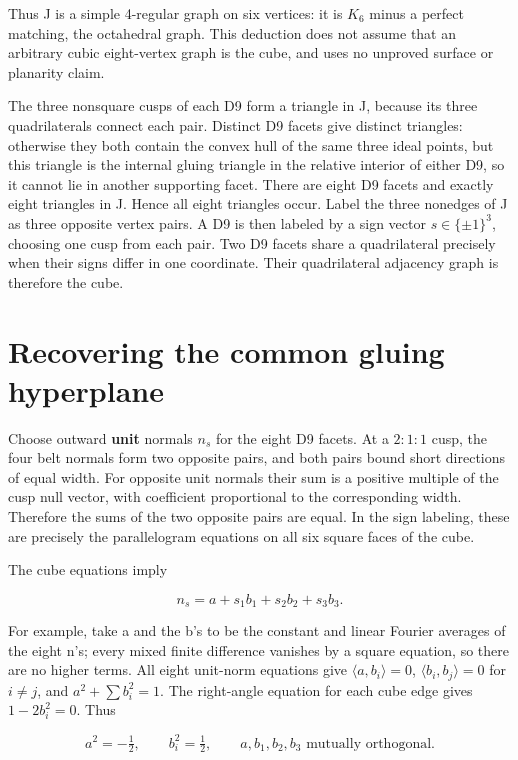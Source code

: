 \documentclass[11pt]{article}
\begin{document}
Thus J is a simple 4-regular graph on six vertices: it is \(K_6\) minus a perfect matching, the octahedral graph. This deduction does not assume that an arbitrary cubic eight-vertex graph is the cube, and uses no unproved surface or planarity claim.

The three nonsquare cusps of each D9 form a triangle in J, because its three quadrilaterals connect each pair. Distinct D9 facets give distinct triangles: otherwise they both contain the convex hull of the same three ideal points, but this triangle is the internal gluing triangle in the relative interior of either D9, so it cannot lie in another supporting facet. There are eight D9 facets and exactly eight triangles in J. Hence all eight triangles occur. Label the three nonedges of J as three opposite vertex pairs. A D9 is then labeled by a sign vector \(s\in\{\pm1\}^3\), choosing one cusp from each pair. Two D9 facets share a quadrilateral precisely when their signs differ in one coordinate. Their quadrilateral adjacency graph is therefore the cube.

\section{Recovering the common gluing hyperplane}\label{recovering-the-common-gluing-hyperplane}

Choose outward \textbf{unit} normals \(n_s\) for the eight D9 facets. At a \(2:1:1\) cusp, the four belt normals form two opposite pairs, and both pairs bound short directions of equal width. For opposite unit normals their sum is a positive multiple of the cusp null vector, with coefficient proportional to the corresponding width. Therefore the sums of the two opposite pairs are equal. In the sign labeling, these are precisely the parallelogram equations on all six square faces of the cube.

The cube equations imply

\[
 n_s=a+s_1b_1+s_2b_2+s_3b_3. \tag{4}
\]

For example, take a and the b's to be the constant and linear Fourier averages of the eight n's; every mixed finite difference vanishes by a square equation, so there are no higher terms. All eight unit-norm equations give \(\langle a,b_i\rangle=0\), \(\langle b_i,b_j\rangle=0\) for \(i\ne j\), and \(a^2+\sum b_i^2=1\). The right-angle equation for each cube edge gives \(1-2b_i^2=0\). Thus

\[
 a^2=-\tfrac12,\qquad b_i^2=\tfrac12,
 \qquad a,b_1,b_2,b_3\text{ mutually orthogonal}. \tag{5}
\]
\end{document}
